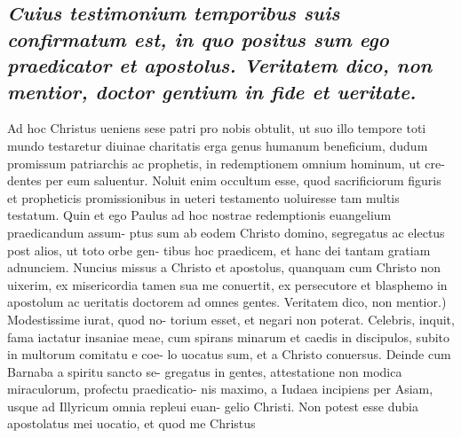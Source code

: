 \documentclass{article}
\begin{document}
\begin{pages}
{}
\subsection*{\textit{Cuius testimonium temporibus suis confirmatum est, in quo positus sum ego praedicator et apostolus. Veritatem dico, non mentior, doctor gentium in fide et ueritate. }}\pstart Ad hoc Christus ueniens sese patri pro nobis obtulit, ut suo illo tempore toti mundo testaretur diuinae charitatis erga genus humanum beneficium, dudum promissum patriarchis ac prophetis, in redemptionem omnium hominum, ut cre- dentes per eum saluentur. Noluit enim occultum esse, quod sacrificiorum figuris et propheticis promissionibus in ueteri testamento uoluiresse tam multis testatum. Quin et ego Paulus ad hoc nostrae redemptionis euangelium praedicandum assum- ptus sum ab eodem Christo domino, segregatus ac electus post alios, ut toto orbe gen- tibus hoc praedicem, et hanc dei tantam gratiam adnunciem. Nuncius missus a Christo et apostolus, quanquam cum Christo non uixerim, ex misericordia tamen sua me conuertit, ex persecutore et blasphemo in apostolum ac ueritatis doctorem ad omnes gentes. Veritatem dico, non mentior.) Modestissime iurat, quod no- torium esset, et negari non poterat. Celebris, inquit, fama iactatur insaniae meae, cum spirans minarum et caedis in discipulos, subito in multorum comitatu e coe- lo uocatus sum, et a Christo conuersus. Deinde cum Barnaba a spiritu sancto se- gregatus in gentes, attestatione non modica miraculorum, profectu praedicatio- nis maximo, a Iudaea incipiens per Asiam, usque  ad Illyricum omnia repleui euan- gelio Christi. Non potest esse dubia apostolatus mei uocatio, et quod me Christus  \pend

\end{pages}
\end{document}
